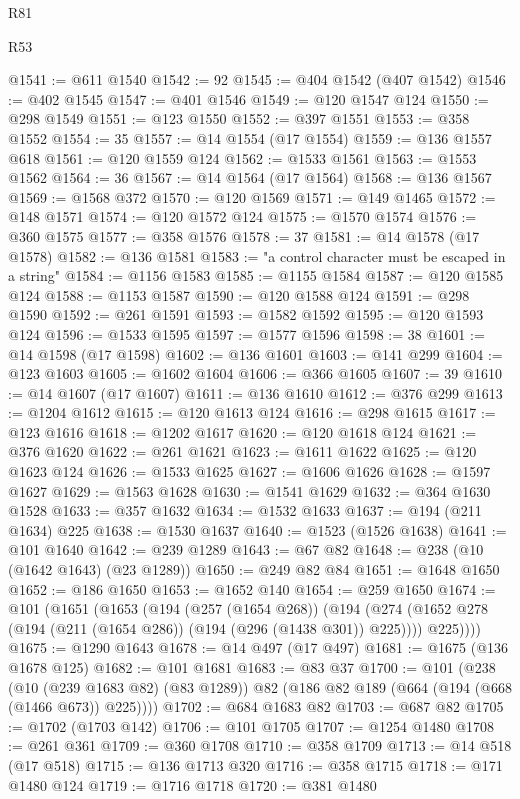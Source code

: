 \begin{lexlean}{R81}
\begin{lexlean}{R53}
\begin{coremodule}
{{{{{{{{{{{{{{{{{{{{{{{{{{{{{{{{{{{{{{{{{{{{{{{{{{{{{{{{{{{{{{{{{{{{{{{{{{{{{{{{{{{{{{{{{{{{{{{{{{{{{{{{{{{{{{{{@1541 := @611 @1540
@1542 := 92
@1545 := @404 @1542 (@407 @1542)
@1546 := @402 @1545
@1547 := @401 @1546
@1549 := @120 @1547 @124
@1550 := @298 @1549
@1551 := @123 @1550
@1552 := @397 @1551
@1553 := @358 @1552
@1554 := 35
@1557 := @14 @1554 (@17 @1554)
@1559 := @136 @1557 @618
@1561 := @120 @1559 @124
@1562 := @1533 @1561
@1563 := @1553 @1562
@1564 := 36
@1567 := @14 @1564 (@17 @1564)
@1568 := @136 @1567
@1569 := @1568 @372
@1570 := @120 @1569
@1571 := @149 @1465
@1572 := @148 @1571
@1574 := @120 @1572 @124
@1575 := @1570 @1574
@1576 := @360 @1575
@1577 := @358 @1576
@1578 := 37
@1581 := @14 @1578 (@17 @1578)
@1582 := @136 @1581
@1583 := "a control character must be escaped in a string"
@1584 := @1156 @1583
@1585 := @1155 @1584
@1587 := @120 @1585 @124
@1588 := @1153 @1587
@1590 := @120 @1588 @124
@1591 := @298 @1590
@1592 := @261 @1591
@1593 := @1582 @1592
@1595 := @120 @1593 @124
@1596 := @1533 @1595
@1597 := @1577 @1596
@1598 := 38
@1601 := @14 @1598 (@17 @1598)
@1602 := @136 @1601
@1603 := @141 @299
@1604 := @123 @1603
@1605 := @1602 @1604
@1606 := @366 @1605
@1607 := 39
@1610 := @14 @1607 (@17 @1607)
@1611 := @136 @1610
@1612 := @376 @299
@1613 := @1204 @1612
@1615 := @120 @1613 @124
@1616 := @298 @1615
@1617 := @123 @1616
@1618 := @1202 @1617
@1620 := @120 @1618 @124
@1621 := @376 @1620
@1622 := @261 @1621
@1623 := @1611 @1622
@1625 := @120 @1623 @124
@1626 := @1533 @1625
@1627 := @1606 @1626
@1628 := @1597 @1627
@1629 := @1563 @1628
@1630 := @1541 @1629
@1632 := @364 @1630 @1528
@1633 := @357 @1632
@1634 := @1532 @1633
@1637 := @194 (@211 @1634) @225
@1638 := @1530 @1637
@1640 := @1523 (@1526 @1638)
@1641 := @101 @1640
@1642 := @239 @1289
@1643 := @67 @82
@1648 := @238 (@10 (@1642 @1643) (@23 @1289))
@1650 := @249 @82 @84
@1651 := @1648 @1650
@1652 := @186 @1650
@1653 := @1652 @140
@1654 := @259 @1650
@1674 := @101
    (@1651
      (@1653
        (@194
          (@257 (@1654 @268))
          (@194
            (@274 (@1652 @278 (@194 (@211 (@1654 @286)) (@194 (@296 (@1438 @301)) @225))))
            @225))))
@1675 := @1290 @1643
@1678 := @14 @497 (@17 @497)
@1681 := @1675 (@136 @1678 @125)
@1682 := @101 @1681
@1683 := @83 @37
@1700 := @101
    (@238
      (@10 (@239 @1683 @82) (@83 @1289))
      @82
      (@186 @82 @189 (@664 (@194 (@668 (@1466 @673)) @225))))
@1702 := @684 @1683 @82
@1703 := @687 @82
@1705 := @1702 (@1703 @142)
@1706 := @101 @1705
@1707 := @1254 @1480
@1708 := @261 @361
@1709 := @360 @1708
@1710 := @358 @1709
@1713 := @14 @518 (@17 @518)
@1715 := @136 @1713 @320
@1716 := @358 @1715
@1718 := @171 @1480 @124
@1719 := @1716 @1718
@1720 := @381 @1480
}}}}}}}}}}}}}}}}}}}}}}}}}}}}}}}}}}}}}}}}}}}}}}}}}}}}}}}}}}}}}}}}}}}}}}}}}}}}}}}}}}}}}}}}}}}}}}}}}}}}}}}}}}}}}}}}
\end{coremodule}
\end{lexlean}
\end{lexlean}
